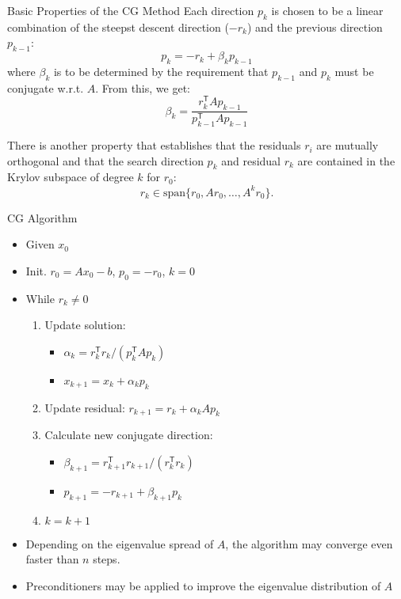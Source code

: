 \documentclass{beamer}
\newcommand{\tran}{\mathsf{T}}
\begin{document}
\begin{frame}[allowframebreaks]{Basic Properties of the CG Method}
	Each direction $p_k$ is chosen to be a linear combination of the steepst descent direction ($-r_k$) and the previous direction $p_{k-1}$:
	\[
		p_k = -r_k + \beta_k p_{k-1}
	\]
	where $\beta_k$ is to be determined by the requirement that $p_{k-1}$ and $p_{k}$ must be conjugate w.r.t. $A$. From this, we get:
	\begin{equation}
		\beta_ k = \frac{r_k^\tran A p_{k-1}}{p_{k-1}^\tran A p_{k-1}}
	\end{equation}
	
	There is another property that establishes that the residuals $r_i$ are mutually orthogonal and that the search direction $p_k$ and residual $r_k$ are contained in the Krylov subspace of degree $k$ for $r_0$:
	\[
		r_k \in \text{span}\{r_0, Ar_0,\ldots, A^kr_0\}.
	\]
\end{frame}

\begin{frame}
	\begin{block}{CG Algorithm}
		\begin{itemize}
			\item Given $x_0$
			\item Init. $r_0 = Ax_0 - b$, $p_0 = - r_0$, $k= 0$
			\item While $r_k \neq 0$
			\begin{enumerate}
				\item Update solution: 
				\begin{itemize}
					\item $\alpha_k = r_k^\tran r_k/ (p_k^\tran A p_k)$
					\item $x_{k+1} = x_k +\alpha_k p_k$
				\end{itemize}
				\item Update residual: $r_{k+1} = r_k + \alpha_k A p_k$
				\item Calculate new conjugate direction:
				\begin{itemize}
					\item $\beta_{k+1} = r_{k+1}^\tran r_{k+1}/(r_k^\tran r_k)$
					\item $p_{k+1} = -r_{k+1} + \beta_{k+1} p_k$
				\end{itemize}
				\item $k = k+1$
			\end{enumerate}
		\end{itemize}
	\end{block}

	\begin{itemize}
		\item Depending on the eigenvalue spread of $A$, the algorithm may converge even faster than $n$ steps.
		\item Preconditioners may be applied to improve the eigenvalue distribution of $A$
	\end{itemize}
\end{frame}
\end{document}
